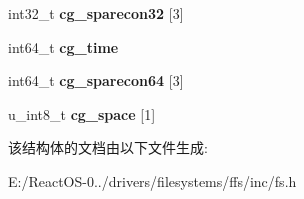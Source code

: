 \begin{DoxyCompactItemize}
int32\+\_\+t {\bfseries cg\+\_\+sparecon32} \mbox{[}3\mbox{]}
\item 
\mbox{\label{structcg_ae2cf84c51422c03daa67cc400da3cc20}} 
int64\+\_\+t {\bfseries cg\+\_\+time}
\item 
\mbox{\label{structcg_a6d53ca6360ffc18d638f244bd3a3a47d}} 
int64\+\_\+t {\bfseries cg\+\_\+sparecon64} \mbox{[}3\mbox{]}
\item 
\mbox{\label{structcg_ab07080046ac58389c390e6d3428036cd}} 
u\+\_\+int8\+\_\+t {\bfseries cg\+\_\+space} \mbox{[}1\mbox{]}
\end{DoxyCompactItemize}


该结构体的文档由以下文件生成\+:\begin{DoxyCompactItemize}
\item 
E\+:/\+React\+O\+S-\/0../drivers/filesystems/ffs/inc/fs.\+h\end{DoxyCompactItemize}
